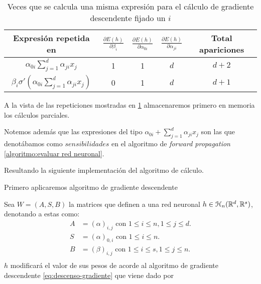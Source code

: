 \begin{table}[H]
    \begin{center}
    \begin{tabular}{| c | c | c | c | c| }
    \hline
    Expresión  repetida en 
    & $\frac{\partial E(h)}{\partial \beta_i}$ 
    & $\frac{\partial E(h)}{\partial \alpha_{0 i}}$ 
    &$\frac{\partial E(h)}{\partial \alpha_{j i}}$ 
    & Total apariciones 
    \\ \hline
    $\alpha_{0 i} \sum_{j=1}^d \alpha_{j i}x_j$ 
    & 1 & 1& $d$ & $d+2$
    \\
    $\beta_i \sigma'
    \left(  
     \alpha_{0 i} 
     \sum_{j=1}^d \alpha_{j i}x_j
    \right)$
    & 0 & 1 & $d$ & $d+1$
    \\ \hline
    \end{tabular}
    \caption{Veces que se calcula una misma expresión 
    para el cálculo de gradiente descendente fijado un
     $i$}
    \label{tab:expresiones_repetidas_en_descenso_gradiente}
    \end{center}
\end{table}

A la vista de las repeticiones mostradas en  \ref{tab:expresiones_repetidas_en_descenso_gradiente}
almacenaremos primero en memoria los cálculos parciales. 

Notemos además que las expresiones del tipo 
$\alpha_{0 i} + \sum_{j=1}^d \alpha_{j i}x_j$  son las que denotábamos como $sensibilidades$ en el algoritmo de \textit{forward propagation} \ref{algoritmo:evaluar red neuronal}.

Resultando la siguiente implementación del algoritmo de cálculo. 

Primero aplicaremos algoritmo de gradiente descendente 

Sea $W = (A,S,B)$ 
la matrices que definen a una red neuronal $h \in \mathcal{H}_n(\mathbb{R}^d,\mathbb{R}^s)$, denotando a estas como: 
\begin{align}\label{eq:representation red neuronal}
    A &= (\alpha)_{i,j} \text{ con } 1 \leq i \leq n , 1 \leq j \leq d. \\
    S &= (\alpha)_{0, i} \text{ con } 1 \leq i \leq n. \\
    B &= (\beta)_{i,j} \text{ con } 1 \leq i \leq s, 1 \leq j \leq n. \\
\end{align}
 $h$ modificará el valor de sus pesos de acorde al algoritmo de gradiente descendente \ref{eq:descenso-gradiente} que viene dado por

